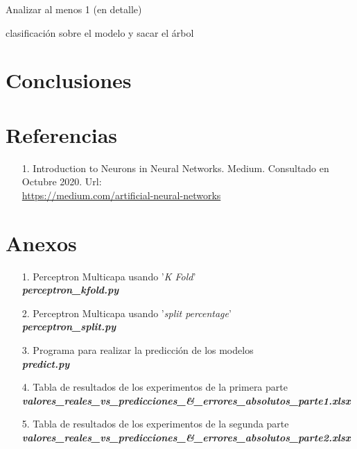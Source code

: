 \documentclass[12pt,a4paper, xcolor=table]{article}
\begin{document}
Analizar al menos 1 (en detalle)

clasificación sobre el modelo y sacar el árbol

\section{Conclusiones}


\clearpage

\section{Referencias}
    \begin{itemize}
        \item [1.] Introduction to Neurons in Neural Networks. Medium. Consultado en Octubre 2020. Url: \\
        \href{https://medium.com/artificial-neural-networks/introduction-to-neurons-in-neural-networks-71828d040a65}{https://medium.com/artificial-neural-networks}
    \end{itemize}
\printindex



  \section{Anexos}
  \begin{itemize}
    \item [1.] Perceptron Multicapa usando '\textit{K Fold}'\\
    \textbf{\textit{perceptron\_kfold.py}}
    \item [2.] Perceptron Multicapa usando '\textit{split percentage}'\\
    \textbf{\textit{perceptron\_split.py}}
    \item [3.] Programa para realizar la predicción de los modelos\\
    \textbf{\textit{predict.py}}
    \item [4.] Tabla de resultados de los experimentos de la primera parte\\
    \textbf{\textit{valores\_reales\_vs\_predicciones\_\&\_errores\_absolutos\_parte1.xlsx}}
    \item [5.] Tabla de resultados de los experimentos de la segunda parte\\
    \textbf{\textit{valores\_reales\_vs\_predicciones\_\&\_errores\_absolutos\_parte2.xlsx}}
  \end{itemize}
\end{document}
